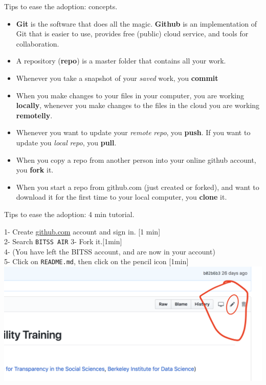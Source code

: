 \documentclass[ignorenonframetext,]{beamer}
\providecommand{\tightlist}{%
  \setlength{\itemsep}{0pt}\setlength{\parskip}{0pt}}
\begin{document}
\begin{frame}{Tips to ease the adoption: concepts.}
\protect\hypertarget{tips-to-ease-the-adoption-concepts.}{}

\begin{itemize}
\tightlist
\item
  \textbf{Git} is the software that does all the magic. \textbf{Github}
  is an implementation of Git that is easier to use, provides free
  (public) cloud service, and tools for collaboration.
\item
  A repository (\textbf{repo}) is a master folder that contains all your
  work.
\item
  Whenever you take a snapshot of your \emph{saved} work, you
  \textbf{commit}
\item
  When you make changes to your files in your computer, you are working
  \textbf{locally}, whenever you make changes to the files in the cloud
  you are working \textbf{remotelly}.
\item
  Whenever you want to update your \emph{remote} \emph{repo}, you
  \textbf{push}. If you want to update you \emph{local} \emph{repo}, you
  \textbf{pull}.
\item
  When you copy a repo from another person into your online github
  account, you \textbf{fork} it.
\item
  When you start a repo from github.com (just created or forked), and
  want to download it for the first time to your local computer, you
  \textbf{clone} it.
\end{itemize}

\end{frame}

\begin{frame}[fragile]{Tips to ease the adoption: 4 min tutorial.}
\protect\hypertarget{tips-to-ease-the-adoption-4-min-tutorial.}{}

1- Create \url{github.com} account and sign in. {[}1 min{]}\\
2- Search \texttt{BITSS\ AIR} 3- Fork it.{[}1min{]}\\
4- (You have left the BITSS account, and are now in your account)\\
5- Click on \texttt{README.md}, then click on the pencil icon {[}1min{]}
\includegraphics{edit.png}

\end{frame}
\end{document}
